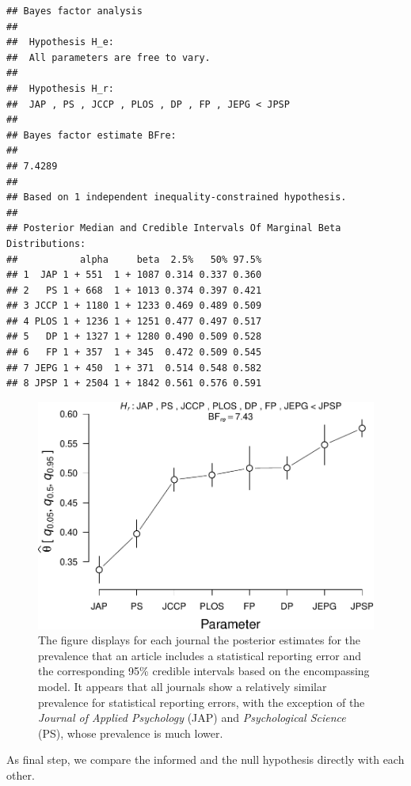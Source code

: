 \documentclass[
  english,
  man,floatsintext]{apa6}
\begin{document}
\begin{verbatim}
## Bayes factor analysis
## 
##  Hypothesis H_e:
##  All parameters are free to vary.
## 
##  Hypothesis H_r:
##  JAP , PS , JCCP , PLOS , DP , FP , JEPG < JPSP 
## 
## Bayes factor estimate BFre:
## 
## 7.4289
## 
## Based on 1 independent inequality-constrained hypothesis.
## 
## Posterior Median and Credible Intervals Of Marginal Beta Distributions:
##           alpha     beta  2.5%   50% 97.5%
## 1  JAP 1 + 551  1 + 1087 0.314 0.337 0.360
## 2   PS 1 + 668  1 + 1013 0.374 0.397 0.421
## 3 JCCP 1 + 1180 1 + 1233 0.469 0.489 0.509
## 4 PLOS 1 + 1236 1 + 1251 0.477 0.497 0.517
## 5   DP 1 + 1327 1 + 1280 0.490 0.509 0.528
## 6   FP 1 + 357  1 + 345  0.472 0.509 0.545
## 7 JEPG 1 + 450  1 + 371  0.514 0.548 0.582
## 8 JPSP 1 + 2504 1 + 1842 0.561 0.576 0.591
\end{verbatim}

\begin{figure}
\centering
\includegraphics{Rpackage_paper_files/figure-latex/journals-1.pdf}
\caption{\label{fig:journals}The figure displays for each journal the posterior estimates for the prevalence that an article includes a statistical reporting error and the corresponding 95\% credible intervals based on the encompassing model. It appears that all journals show a relatively similar prevalence for statistical reporting errors, with the exception of the \emph{Journal of Applied Psychology} (JAP) and \emph{Psychological Science} (PS), whose prevalence is much lower.}
\end{figure}

As final step, we compare the informed and the null hypothesis directly
with each other.
\end{document}
